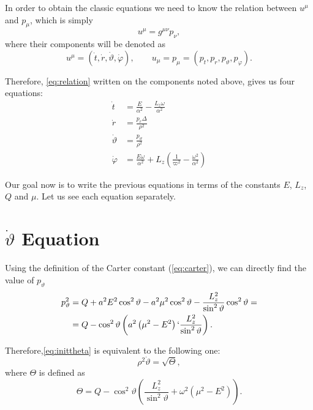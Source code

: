 In order to obtain the classic equations we need to know the relation between $u^\mu$ and $p_\mu$, which is simply
\begin{equation}
	\label{eq:relation}
	u^\mu = g^{\mu\nu}p_\nu,
\end{equation}
where their components will be denoted as
\[
	u^\mu = (\dot{t}, \dot{r}, \dot{\vartheta}, \dot{\varphi}), \qquad u_\mu = p_\mu = (p_t, p_r, p_\vartheta, p_\varphi).
\]

Therefore, \autoref{eq:relation} written on the components noted above, gives us four equations:
\begin{align}
	\label{eq:initt}
	\dot{t} &= \frac{E}{\alpha^2} - \frac{L_z \omega}{\alpha^2} \\
	\label{eq:initr}
	\dot{r} &= \frac{p_r \Delta}{\rho^2} \\
	\label{eq:inittheta}
	\dot{\vartheta} &= \frac{p_\vartheta}{\rho^2} \\
	\label{eq:initphi}
	\dot{\varphi} &= \frac{E \omega}{\alpha^2} + L_z\left( \frac{1}{\varpi^2} - \frac{\omega^2}{\alpha^2} \right)
\end{align}

Our goal now is to write the previous equations in terms of the constants $E$, $L_z$, $Q$ and $\mu$. Let us see each equation separately.

\section{$\dot{\vartheta}$ Equation}

Using the definition of the Carter constant (\autoref{eq:carter}), we can directly find the value of $p_\vartheta$
\begin{align}
	p_\vartheta^2 &= Q + a^2E^2\cos^2\vartheta - a^2\mu^2\cos^2\vartheta - \frac{L_z^2}{\sin^2\vartheta}\cos^2\vartheta = \\
	&= Q - \cos^2\vartheta\left( a^2\left(\mu^2 - E^2 \right) `\frac{L_z^2}{\sin^2\vartheta} \right).
\end{align}

Therefore,\autoref{eq:inittheta} is equivalent to the following one:
\begin{equation}
	\rho^2 \dot{\vartheta} = \sqrt{\Theta},
\end{equation}
where $\Theta$ is defined as
\begin{equation}
	\label{eq:deftheta}
	\Theta = Q - \cos^2\vartheta \left( \frac{L_z^2}{\sin^2\vartheta} + \omega^2\left(\mu^2 - E^2 \right)\right).
\end{equation}

